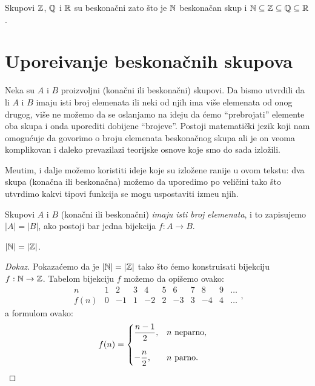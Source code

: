 \begin{EX}
  Skupovi $\mathbb{Z}$, $\mathbb{Q}$ i $\mathbb{R}$ su beskona\v cni zato \v sto je $\mathbb{N}$ beskona\v can skup i $\mathbb{N} \subseteq \mathbb{Z} \subseteq \mathbb{Q} \subseteq \mathbb{R}$.
\end{EX}

\section{Upore\dj ivanje beskona\v cnih skupova}

Neka su $A$ i $B$ proizvoljni (kona\v cni ili beskona\v cni) skupovi.
Da bismo utvrdili da li $A$ i $B$ imaju isti broj elemenata
ili neki od njih ima vi\v se elemenata od onog drugog, vi\v se ne mo\v zemo da se oslanjamo na ideju da \'cemo
\enquote{prebrojati} elemente oba skupa i onda uporediti dobijene \enquote{brojeve}.
Postoji matemati\v cki jezik koji nam omogu\'cuje da govorimo o broju elemenata beskona\v cnog skupa ali je on
veoma komplikovan i daleko prevazilazi teorijske osnove koje smo do sada izlo\v zili.

Me\dj utim, i dalje mo\v zemo koristiti ideje koje su izlo\v zene ranije u ovom tekstu:
dva skupa (kona\v cna ili beskona\v cna) mo\v zemo da uporedimo po veli\v cini tako \v sto
utvrdimo kakvi tipovi funkcija se mogu uspostaviti izme\dj u njih.

\begin{DEF}
  Skupovi $A$ i $B$ (kona\v cni ili beskona\v cni) \emph{imaju isti broj elemenata}, i to zapisujemo $|A| = |B|$,
  ako postoji bar jedna bijekcija $f : A \to B$.
\end{DEF}

\begin{THM}
  $|\mathbb{N}| = |\mathbb{Z}|$.
\end{THM}
\begin{proof}[Dokaz]
  Pokaza\'cemo da je $|\mathbb{N}| = |\mathbb{Z}|$ tako \v sto \'cemo konstruisati bijekciju $f : \mathbb{N} \to \mathbb{Z}$. Tabelom bijekciju $f$
  mo\v zemo da opi\v semo ovako:
  $$
    \begin{array}{c|ccccccccccccccccc}
      n    & 1 & 2  & 3 & 4  & 5 & 6  & 7 & 8  & 9 & \ldots \\ \hline
      f(n) & 0 & -1 & 1 & -2 & 2 & -3 & 3 & -4 & 4 & \ldots
    \end{array},
  $$
  a formulom ovako:
  $$
    f(n) = \begin{cases}
      \displaystyle \frac{n-1}{2}, & n \text{\ neparno},\\[5mm]
      \displaystyle -\frac{n}{2},  & n \text{\ parno}.\qquad\qedhere
    \end{cases}
  $$
\end{proof}

